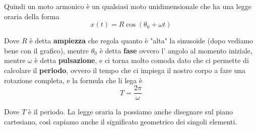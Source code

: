 \documentclass{rapport}
\begin{document}
Quindi un moto armonico è un qualsiasi moto unidimensionale che ha una legge oraria della forma 
\[
x(t) = R\cos(\theta_0 + \omega t)
\]

Dove $R$ è detta \textbf{ampiezza} che regola quanto è "alta" la sinusoide (dopo vediamo bene con il grafico), mentre $\theta_0$ è detta \textbf{fase} ovvero l' angolo al momento iniziale, mentre $\omega$ è detta \textbf{pulsazione}, e ci torna molto comoda dato che ci permette di calcolare il \textbf{periodo}, ovvero il tempo che ci impiega il nostro corpo a fare una rotazione completa, e la formula che li lega è 
\[
T = \dfrac{2\pi}{\omega}
\]

Dove $T$ è il periodo. La legge oraria la possiamo anche disegnare sul piano cartesiano, così capiamo anche il significato geometrico dei singoli elementi.
\end{document}
